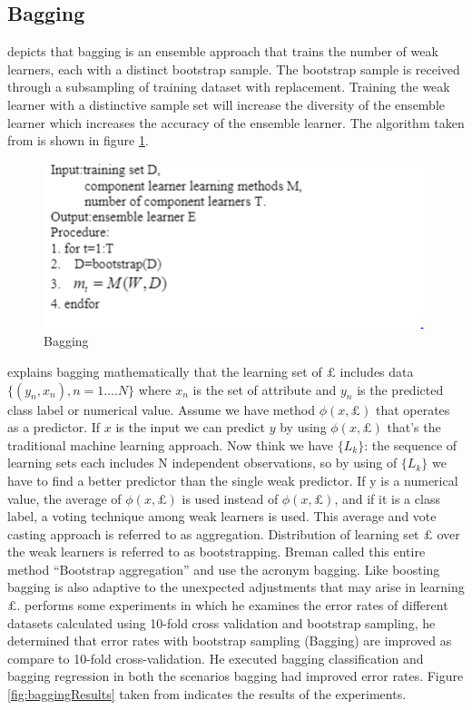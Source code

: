 \documentclass[12pt]{article}
\begin{document}
\subsection{Bagging}
\citep{huang2009research} depicts that bagging is an ensemble approach that trains the number of weak learners, each with a distinct bootstrap sample. The bootstrap sample is received through a subsampling of training dataset with replacement. Training the weak learner with a distinctive sample set will increase the diversity of the ensemble learner which increases the accuracy of the ensemble learner. The algorithm taken from \citep{huang2009research} is shown in figure \ref{fig:bagging}. 
 \begin{figure}[h!]
 	\centering
	\includegraphics{bagging.png}
	\caption{Bagging ~\citep{huang2009research}}
	\label{fig:bagging}
\end{figure}
\citep{breiman1996bagging} explains bagging mathematically that the learning set of $\pounds$ includes data $\{(y_n, x_n), n=1….N\}$ where $x_n$ is the set of attribute and $y_n$ is the predicted class label or numerical value. Assume we have method $\phi (x, \pounds)$ that operates as a predictor. If $x$ is the input we can predict $y$ by using $\phi (x, \pounds)$ that’s the traditional machine learning approach. Now think we have $\{L_k\}$: the sequence of learning sets each includes N independent observations, so by using of $\{L_k\}$ we have to find a better predictor than the single weak predictor. If y is a numerical value, the average of $\phi (x, \pounds)$ is used instead of $\phi (x, \pounds)$, and if it is a class label, a voting technique among weak learners is used. This average and vote casting approach is referred to as aggregation. Distribution of learning set $\pounds$ over the weak learners is referred to as bootstrapping. Breman called this entire method “Bootstrap aggregation” and use the acronym bagging. Like boosting bagging is also adaptive to the unexpected adjustments that may arise in learning $\pounds$. \citep{breiman1996bagging} performs some experiments in which he examines the error rates of different datasets calculated using 10-fold cross validation and bootstrap sampling, he determined that error rates with bootstrap sampling (Bagging) are improved as compare to 10-fold cross-validation. He executed bagging classification and bagging regression in both the scenarios bagging had improved error rates. Figure \ref{fig:baggingResults} taken from \citep{breiman1996bagging} indicates the results of the experiments.
\end{document}
